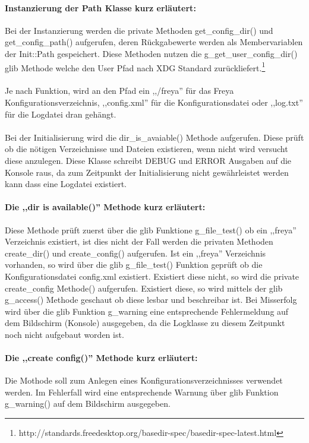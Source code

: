 \paragraph{Instanzierung der Path Klasse kurz erläutert:}
Bei der Instanzierung werden die private Methoden get\_config\_dir() und get\_config\_path() aufgerufen, deren Rückgabewerte werden
als Membervariablen der Init::Path gespeichert. Diese Methoden nutzen die g\_get\_user\_config\_dir() glib Methode
welche den User Pfad nach XDG Standard zurückliefert.\footnote{http://standards.freedesktop.org/basedir-spec/basedir-spec-latest.html}
\\
\\
Je nach Funktion, wird an den Pfad ein ,,/freya'' für das Freya Konfigurationsverzeichnis, ,,config.xml''
für die Konfigurationsdatei oder ,,log.txt'' für die Logdatei dran gehängt.
\\
\\
Bei der Initialisierung wird die dir\_is\_avaiable()
Methode aufgerufen. Diese prüft ob die nötigen Verzeichnisse und Dateien existieren, wenn nicht wird versucht diese
anzulegen. Diese Klasse schreibt DEBUG und ERROR Ausgaben auf die Konsole raus, da zum Zeitpunkt der Initialisierung
nicht gewährleistet werden kann dass eine Logdatei existiert.


\paragraph{Die ,,dir is available()'' Methode kurz erläutert:}
Diese Methode prüft zuerst über die glib Funktione g\_file\_test() ob ein ,,freya'' Verzeichnis existiert,
ist dies nicht der Fall werden die privaten Methoden create\_dir() und create\_config() aufgerufen.
Ist ein ,,freya'' Verzeichnis vorhanden, so wird über die glib g\_file\_test() Funktion geprüft ob die Konfigurationsdatei
config.xml existiert. Existiert diese nicht, so wird die private create\_config Methode() aufgerufen.
Existiert diese, so wird mittels der glib g\_access() Methode geschaut ob diese lesbar und beschreibar ist. 
Bei Misserfolg wird über die glib Funktion g\_warning eine entsprechende Fehlermeldung auf
dem Bildschirm (Konsole) ausgegeben, da die Logklasse zu diesem Zeitpunkt noch nicht aufgebaut worden ist.


\paragraph{Die ,,create config()'' Methode kurz erläutert:}
Die Mothode soll zum Anlegen eines Konfigurationsverzeichnisses verwendet werden.
Im Fehlerfall wird eine entsprechende Warnung über glib Funktion g\_warning() auf dem Bildschirm ausgegeben.

